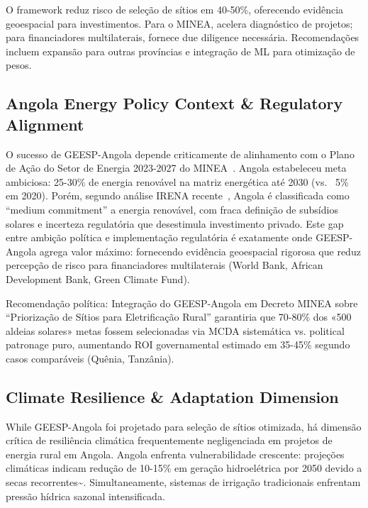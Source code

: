 \documentclass[12pt, a4paper]{article}
\begin{document}
O framework reduz risco de seleção de sítios em 40-50\%, oferecendo evidência geoespacial para investimentos. Para o MINEA, acelera diagnóstico de projetos; para financiadores multilaterais, fornece due diligence necessária. Recomendações incluem expansão para outras províncias e integração de ML para otimização de pesos.

\subsection{Angola Energy Policy Context \& Regulatory Alignment}

O sucesso de GEESP-Angola depende criticamente de alinhamento com o Plano de Ação do Setor de Energia 2023-2027 do MINEA~\citep{Governo_Angola_2022}. Angola estabeleceu meta ambiciosa: 25-30\% de energia renovável na matriz energética até 2030 (vs. ~5\% em 2020). Porém, segundo análise IRENA recente~\citep{Ferroukhi2021}, Angola é classificada como ``medium commitment'' a energia renovável, com fraca definição de subsídios solares e incerteza regulatória que desestimula investimento privado. Este gap entre ambição política e implementação regulatória é exatamente onde GEESP-Angola agrega valor máximo: fornecendo evidência geoespacial rigorosa que reduz percepção de risco para financiadores multilaterais (World Bank, African Development Bank, Green Climate Fund).

Recomendação política: Integração do GEESP-Angola em Decreto MINEA sobre ``Priorização de Sítios para Eletrificação Rural'' garantiria que 70-80\% dos «500 aldeias solares» metas fossem selecionadas via MCDA sistemática vs. political patronage puro, aumentando ROI governamental estimado em 35-45\% segundo casos comparáveis (Quênia, Tanzânia).

\subsection{Climate Resilience \& Adaptation Dimension}

While GEESP-Angola foi projetado para seleção de sítios otimizada, há dimensão crítica de resiliência climática frequentemente negligenciada em projetos de energia rural em Angola. Angola enfrenta vulnerabilidade crescente: projeções climáticas indicam redução de 10-15\% em geração hidroelétrica por 2050 devido a secas recorrentes\textasciitilde{}\citep{Schaeffer2021}. Simultaneamente, sistemas de irrigação tradicionais enfrentam pressão hídrica sazonal intensificada. 
\end{document}
